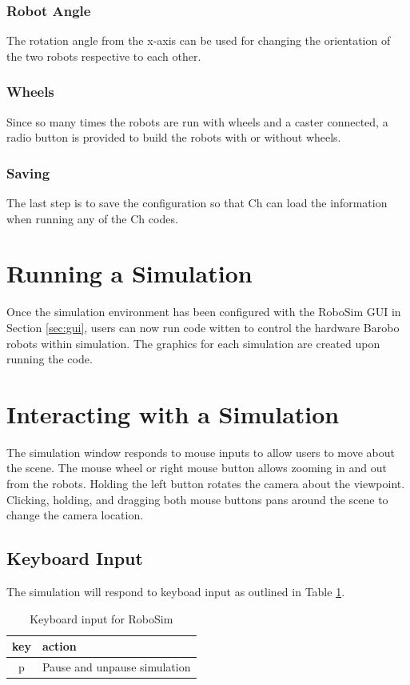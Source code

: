 \documentclass{article}
\begin{document}
\subsubsection{Robot Angle}
The rotation angle from the x-axis can be used for changing the orientation of the two robots
respective to each other. 

\subsubsection{Wheels}
Since so many times the robots are run with wheels and a caster connected, a radio button is provided
to build the robots with or without wheels.

\subsubsection{Saving}
The last step is to save the configuration so that Ch can load the information when running any
of the Ch codes.

\section{Running a Simulation}
Once the simulation environment has been configured with the RoboSim GUI in Section \ref{sec:gui}, users
can now run code witten to control the hardware Barobo robots within simulation.  The graphics for
each simulation are created upon running the code.

\section{Interacting with a Simulation}
The simulation window responds to mouse inputs to allow users to move about the scene.
The mouse wheel or right mouse button allows zooming in and out from the robots.  Holding the 
left button rotates the camera about the viewpoint.  Clicking, holding, and dragging both mouse
buttons pans around the scene to change the camera location.

\subsection{Keyboard Input}
The simulation will respond to keyboad input as outlined in Table \ref{tab:keys}.

\begin{table}[H]
	\begin{center}
	\begin{tabular}{c | l }
		\hline \hline
		\textbf{key} & \textbf{action} \\ \hline
		p & Pause and unpause simulation \\
		\hline \hline
	\end{tabular}
	\caption{Keyboard input for RoboSim}
	\label{tab:keys}
	\end{center}
\end{table}
\end{document}
